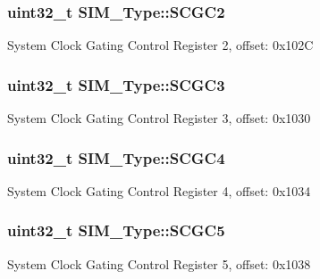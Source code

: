\subsubsection[{\texorpdfstring{S\+C\+G\+C2}{SCGC2}}]{ uint32\+\_\+t S\+I\+M\+\_\+\+Type\+::\+S\+C\+G\+C2}\hypertarget{structSIM__Type_a74c36576eed017405dfdfdd307f6e58f}{}\label{structSIM__Type_a74c36576eed017405dfdfdd307f6e58f}
System Clock Gating Control Register 2, offset\+: 0x102C 
\subsubsection[{\texorpdfstring{S\+C\+G\+C3}{SCGC3}}]{ uint32\+\_\+t S\+I\+M\+\_\+\+Type\+::\+S\+C\+G\+C3}\hypertarget{structSIM__Type_a5c763f4fc87c5257c35ec8c5953a1196}{}\label{structSIM__Type_a5c763f4fc87c5257c35ec8c5953a1196}
System Clock Gating Control Register 3, offset\+: 0x1030 
\subsubsection[{\texorpdfstring{S\+C\+G\+C4}{SCGC4}}]{ uint32\+\_\+t S\+I\+M\+\_\+\+Type\+::\+S\+C\+G\+C4}\hypertarget{structSIM__Type_ab35fe0b2593c29a2fd320cf4a667094c}{}\label{structSIM__Type_ab35fe0b2593c29a2fd320cf4a667094c}
System Clock Gating Control Register 4, offset\+: 0x1034 
\subsubsection[{\texorpdfstring{S\+C\+G\+C5}{SCGC5}}]{ uint32\+\_\+t S\+I\+M\+\_\+\+Type\+::\+S\+C\+G\+C5}\hypertarget{structSIM__Type_a139bbc6054a970f8ed4bfddaf5a97dd2}{}\label{structSIM__Type_a139bbc6054a970f8ed4bfddaf5a97dd2}
System Clock Gating Control Register 5, offset\+: 0x1038 
